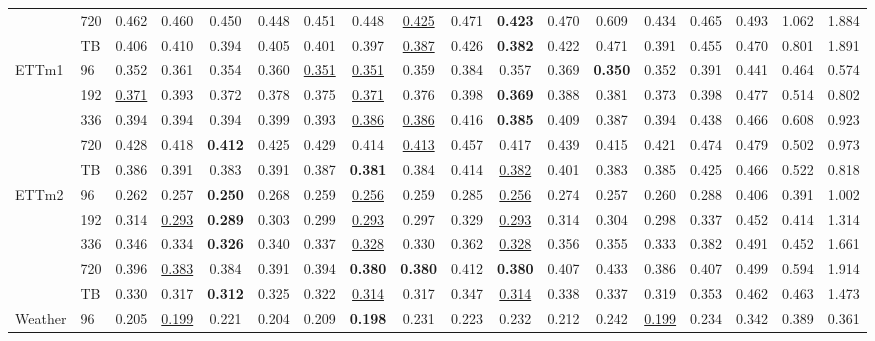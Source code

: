 \begin{table}
\begin{tabular}{@{}llcccccccccccccccc@{}}
 & 720 & 0.462 & 0.460 & 0.450 & 0.448 & 0.451 & 0.448 & \underline{0.425} & 0.471 & \textbf{0.423} & 0.470 & 0.609 & 0.434 & 0.465 & 0.493 & 1.062 & 1.884\\
 & TB & 0.406 & 0.410 & 0.394 & 0.405 & 0.401 & 0.397 & \underline{0.387} & 0.426 & \textbf{0.382} & 0.422 & 0.471 & 0.391 & 0.455 & 0.470 & 0.801 & 1.891\\
\midrule
\multirow{5}{*}{ETTm1} & 96 & 0.352 & 0.361 & 0.354 & 0.360 & \underline{0.351} & \underline{0.351} & 0.359 & 0.384 & 0.357 & 0.369 & \textbf{0.350} & 0.352 & 0.391 & 0.441 & 0.464 & 0.574\\
 & 192 & \underline{0.371} & 0.393 & 0.372 & 0.378 & 0.375 & \underline{0.371} & 0.376 & 0.398 & \textbf{0.369} & 0.388 & 0.381 & 0.373 & 0.398 & 0.477 & 0.514 & 0.802\\
 & 336 & 0.394 & 0.394 & 0.394 & 0.399 & 0.393 & \underline{0.386} & \underline{0.386} & 0.416 & \textbf{0.385} & 0.409 & 0.387 & 0.394 & 0.438 & 0.466 & 0.608 & 0.923\\
 & 720 & 0.428 & 0.418 & \textbf{0.412} & 0.425 & 0.429 & 0.414 & \underline{0.413} & 0.457 & 0.417 & 0.439 & 0.415 & 0.421 & 0.474 & 0.479 & 0.502 & 0.973\\
 & TB & 0.386 & 0.391 & 0.383 & 0.391 & 0.387 & \textbf{0.381} & 0.384 & 0.414 & \underline{0.382} & 0.401 & 0.383 & 0.385 & 0.425 & 0.466 & 0.522 & 0.818\\
\midrule
\multirow{5}{*}{ETTm2} & 96 & 0.262 & 0.257 & \textbf{0.250} & 0.268 & 0.259 & \underline{0.256} & 0.259 & 0.285 & \underline{0.256} & 0.274 & 0.257 & 0.260 & 0.288 & 0.406 & 0.391 & 1.002\\
 & 192 & 0.314 & \underline{0.293} & \textbf{0.289} & 0.303 & 0.299 & \underline{0.293} & 0.297 & 0.329 & \underline{0.293} & 0.314 & 0.304 & 0.298 & 0.337 & 0.452 & 0.414 & 1.314\\
 & 336 & 0.346 & 0.334 & \textbf{0.326} & 0.340 & 0.337 & \underline{0.328} & 0.330 & 0.362 & \underline{0.328} & 0.356 & 0.355 & 0.333 & 0.382 & 0.491 & 0.452 & 1.661\\
 & 720 & 0.396 & \underline{0.383} & 0.384 & 0.391 & 0.394 & \textbf{0.380} & \textbf{0.380} & 0.412 & \textbf{0.380} & 0.407 & 0.433 & 0.386 & 0.407 & 0.499 & 0.594 & 1.914\\
 & TB & 0.330 & 0.317 & \textbf{0.312} & 0.325 & 0.322 & \underline{0.314} & 0.317 & 0.347 & \underline{0.314} & 0.338 & 0.337 & 0.319 & 0.353 & 0.462 & 0.463 & 1.473\\
\midrule
\multirow{5}{*}{Weather} & 96 & 0.205 & \underline{0.199} & 0.221 & 0.204 & 0.209 & \textbf{0.198} & 0.231 & 0.223 & 0.232 & 0.212 & 0.242 & \underline{0.199} & 0.234 & 0.342 & 0.389 & 0.361\\

\end{tabular}
\end{table}
